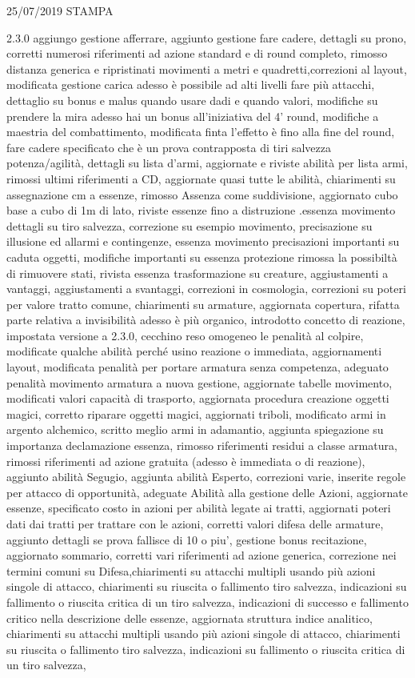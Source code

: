 \documentclass[a4paper,11pt,twoside,openany]{book}
\begin{document}
{{	25/07/2019 STAMPA

	2.3.0 aggiungo gestione afferrare, aggiunto gestione fare cadere, dettagli su prono, corretti numerosi riferimenti ad azione standard e di round completo, rimosso distanza generica e ripristinati movimenti a metri e quadretti,correzioni al layout, modificata gestione carica adesso è possibile ad alti livelli fare più attacchi, dettaglio su bonus e malus quando usare dadi e quando valori, modifiche su prendere la mira adesso hai un bonus all'iniziativa del 4' round, modifiche a maestria del combattimento, modificata finta l'effetto è fino alla fine del round, fare cadere specificato che è un prova contrapposta di tiri salvezza potenza/agilità, dettagli su lista d'armi, aggiornate e riviste abilità per lista armi, rimossi ultimi riferimenti a CD, aggiornate quasi tutte le abilità, chiarimenti su assegnazione cm a essenze, rimosso Assenza come suddivisione, aggiornato cubo base a cubo di 1m di lato, riviste essenze fino a distruzione .essenza movimento dettagli su tiro salvezza, correzione su esempio movimento, precisazione su illusione ed allarmi e contingenze, essenza movimento precisazioni importanti su caduta oggetti, modifiche importanti su essenza protezione rimossa la possibiltà di rimuovere stati, rivista essenza trasformazione su creature, aggiustamenti a vantaggi, aggiustamenti a svantaggi, correzioni in cosmologia, correzioni su poteri per valore tratto comune, chiarimenti su armature, aggiornata copertura, rifatta parte relativa a invisibilità adesso è più organico, introdotto concetto di reazione, impostata versione a 2.3.0, cecchino reso omogeneo le penalità al colpire, modificate qualche abilità perché usino reazione o immediata, aggiornamenti layout, modificata penalità per portare armatura senza competenza, adeguato penalità movimento armatura a nuova gestione, aggiornate tabelle movimento, modificati valori capacità di trasporto, aggiornata procedura creazione oggetti magici, corretto riparare oggetti magici, aggiornati triboli, modificato armi in argento alchemico, scritto meglio armi in adamantio, aggiunta spiegazione su importanza declamazione essenza, rimosso riferimenti residui a classe armatura, rimossi riferimenti ad azione gratuita (adesso è immediata o di reazione), aggiunto abilità Segugio, aggiunta abilità Esperto, correzioni varie, inserite regole per attacco di opportunità, adeguate Abilità alla gestione delle Azioni, aggiornate essenze, specificato costo in azioni per abilità legate ai tratti, aggiornati poteri dati dai tratti per trattare con le azioni, corretti valori difesa delle armature, aggiunto dettagli se prova fallisce di 10 o piu', gestione bonus recitazione, aggiornato sommario, corretti vari riferimenti ad azione generica, correzione nei termini comuni su Difesa,chiarimenti su attacchi multipli usando più azioni singole di attacco, chiarimenti su riuscita o fallimento tiro salvezza, indicazioni su fallimento o riuscita critica di un tiro salvezza, indicazioni di successo e fallimento critico nella descrizione delle essenze, aggiornata struttura indice analitico, chiarimenti su attacchi multipli usando più azioni singole di attacco, chiarimenti su riuscita o fallimento tiro salvezza, indicazioni su fallimento o riuscita critica di un tiro salvezza, }}
\end{document}
